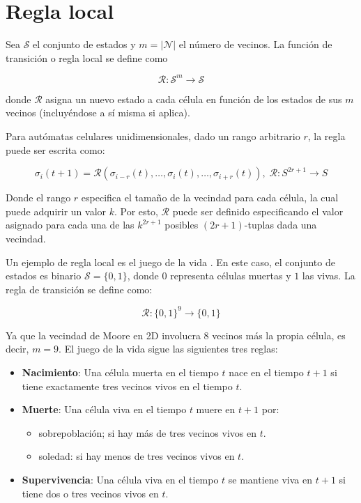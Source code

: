 \section{Regla local}

Sea $\mathcal{S}$ el conjunto de estados y $m = |\mathcal{N}|$ el número de vecinos. La función de transición o regla local se define como 

\[
\mathcal{R}: \mathcal{S}^m \to \mathcal{S}
\] 

donde $\mathcal{R}$ asigna un nuevo estado a cada célula en función de los estados de sus $m$ vecinos (incluyéndose a sí misma si aplica).

Para autómatas celulares unidimensionales, dado un rango arbitrario $r$, la regla puede ser escrita como:

\[
\sigma_{i}(t + 1) = \mathcal{R}(\sigma_{i-r}(t), \dots, \sigma_{i}(t), \dots, \sigma_{i+r} (t)), \; \mathcal{R}:  S^{2r + 1} \to S
\]

Donde el rango $r$ especifica el tamaño de la vecindad para cada célula, la cual puede adquirir un valor $k$. Por esto, $\mathcal{R}$ puede ser definido especificando el valor asignado para cada una de las $k^{2r + 1}$ posibles $(2r+1)$-tuplas dada una vecindad.

Un ejemplo de regla local es el juego de la vida \cite{life}. En este caso, el conjunto de estados es binario $\mathcal{S} = \{ 0, 1 \}$, donde $0$ representa células muertas y $1$ las vivas. La regla de transición se define como:

\[
\mathcal{R}: \{ 0, 1 \}^9 \to \{ 0, 1\}
\]

Ya que la vecindad de Moore en 2D involucra 8 vecinos más la propia célula, es decir, $m = 9$. El juego de la vida sigue las siguientes tres reglas:

\begin{itemize}
	
	\item \textbf{Nacimiento}: Una célula muerta en el tiempo $t$ nace en el tiempo $t + 1$ si tiene exactamente tres vecinos vivos en el tiempo $t$.
	
	
	
	\item \textbf{Muerte}: Una célula viva en el tiempo $t$ muere en $t + 1$ por:
	
	\begin{itemize}
		
		\item sobrepoblación; si hay más de tres vecinos vivos en $t$.
		
		\item soledad: si hay menos de tres vecinos vivos en $t$.
		
	\end{itemize}
	
	
	
	\item \textbf{Supervivencia}: Una célula viva en el tiempo $t$ se mantiene viva en $t + 1$ si tiene dos o tres vecinos vivos en $t$.	 
	
\end{itemize}

